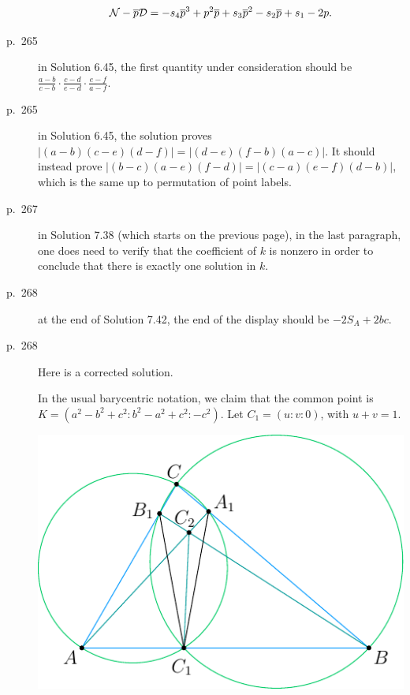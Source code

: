 \documentclass[11pt]{scrartcl}
\begin{document}
\begin{description}
  \[ \mathcal{N} - \overline p \mathcal{D}
    = -s_4 \overline p^3 + p^2 \overline p + s_3 \overline p^2 - s_2 \overline p + s_1 - 2 p.  \]
\item[p.\  265] in Solution 6.45, the first quantity under consideration should be
  $\frac{a-b}{c-b}\cdot\frac{c-d}{e-d}\cdot\frac{e-f}{a-f}$.
\item[p.\  265] in Solution 6.45, the solution proves $|(a-b)(c-e)(d-f)|=|(d-e)(f-b)(a-c)|$.
  It should instead prove $|(b-c)(a-e)(f-d)|=|(c-a)(e-f)(d-b)|$,
  which is the same up to permutation of point labels.
\item[p.\ 267] in Solution 7.38 (which starts on the previous page),
  in the last paragraph, one does need to verify that the coefficient of $k$ is nonzero
  in order to conclude that there is exactly one solution in $k$.
\item[p.\  268] at the end of Solution 7.42, the end of the display should be $-2S_A+2bc$.
\item[p.\  268] 
  Here is a corrected solution.

  In the usual barycentric notation,
  we claim that the common point is $K = \left( a^2-b^2+c^2 : b^2-a^2+c^2 : -c^2 \right)$.
  Let $C_1 = (u:v:0)$, with $u+v=1$.
  \begin{center}
    \includegraphics{sharygin-figure.pdf}
  \end{center}


\end{description}
\end{document}
